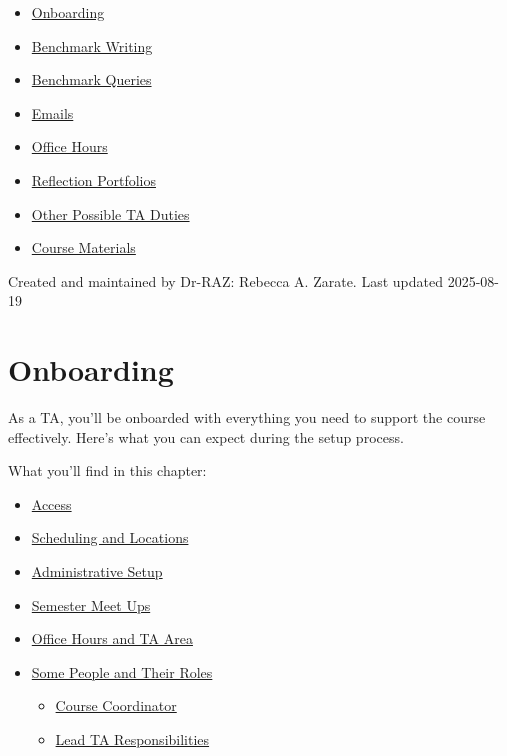 \documentclass[
]{article}
\providecommand{\tightlist}{%
  \setlength{\itemsep}{0pt}\setlength{\parskip}{0pt}}
\begin{document}
\begin{itemize}
\tightlist
\item
  \protect\hyperlink{onboarding}{Onboarding}
\item
  \protect\hyperlink{benchmark-writing}{Benchmark Writing}
\item
  \protect\hyperlink{benchmark-queries}{Benchmark Queries}
\item
  \protect\hyperlink{emails}{Emails}
\item
  \protect\hyperlink{office-hours}{Office Hours}
\item
  \protect\hyperlink{reflection-portfolios}{Reflection Portfolios}
\item
  \protect\hyperlink{other-possible-ta-duties}{Other Possible TA Duties}
\item
  \protect\hyperlink{course-materials}{Course Materials}
\end{itemize}

Created and maintained by Dr-RAZ: Rebecca A. Zarate. Last updated 2025-08-19

\hypertarget{onboarding}{%
\section{Onboarding}\label{onboarding}}

As a TA, you'll be onboarded with everything you need to support the course effectively. Here's what you can expect during the setup process.

What you'll find in this chapter:

\begin{itemize}
\tightlist
\item
  \protect\hyperlink{access}{Access}
\item
  \protect\hyperlink{scheduling-and-locations}{Scheduling and Locations}
\item
  \protect\hyperlink{administrative-setup}{Administrative Setup}
\item
  \protect\hyperlink{semester-meet-ups}{Semester Meet Ups}
\item
  \protect\hyperlink{office-hours-and-ta-area}{Office Hours and TA Area}
\item
  \protect\hyperlink{some-people-and-their-roles}{Some People and Their Roles}

  \begin{itemize}
  \tightlist
  \item
    \protect\hyperlink{course-coordinator}{Course Coordinator}
  \item
    \protect\hyperlink{lead-ta-responsibilities}{Lead TA Responsibilities}
  \end{itemize}
\end{itemize}
\end{document}
